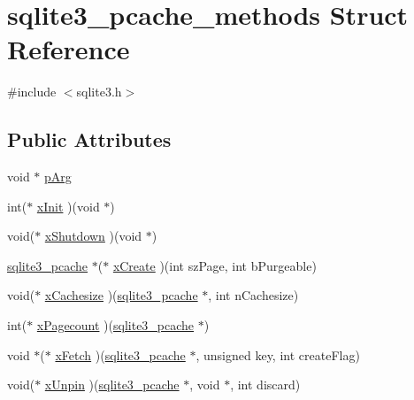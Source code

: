 \hypertarget{structsqlite3__pcache__methods}{}\section{sqlite3\+\_\+pcache\+\_\+methods Struct Reference}
\label{structsqlite3__pcache__methods}


{\ttfamily \#include $<$sqlite3.\+h$>$}

\subsection*{Public Attributes}
\begin{DoxyCompactItemize}
\item 
void $\ast$ \mbox{\hyperlink{structsqlite3__pcache__methods_ac71a23fce5a94ac9bc6babdbbaf1b5b4}{p\+Arg}}
\item 
int($\ast$ \mbox{\hyperlink{structsqlite3__pcache__methods_ac75d3dbf840e6f05ea08d35ad0457fb2}{x\+Init}} )(void $\ast$)
\item 
void($\ast$ \mbox{\hyperlink{structsqlite3__pcache__methods_aa2835c25fac454b7ee7cfd9e625700d7}{x\+Shutdown}} )(void $\ast$)
\item 
\mbox{\hyperlink{sqlite3_8h_a096c453d937d51f7926d7d31c8e0bd2f}{sqlite3\+\_\+pcache}} $\ast$($\ast$ \mbox{\hyperlink{structsqlite3__pcache__methods_ac903d0438a7a1554c818b4c17585e790}{x\+Create}} )(int sz\+Page, int b\+Purgeable)
\item 
void($\ast$ \mbox{\hyperlink{structsqlite3__pcache__methods_ac9ccbed1bea2a902906bfeaa6a330b40}{x\+Cachesize}} )(\mbox{\hyperlink{sqlite3_8h_a096c453d937d51f7926d7d31c8e0bd2f}{sqlite3\+\_\+pcache}} $\ast$, int n\+Cachesize)
\item 
int($\ast$ \mbox{\hyperlink{structsqlite3__pcache__methods_a1e0895008a701c1843336f0e0dcd3f46}{x\+Pagecount}} )(\mbox{\hyperlink{sqlite3_8h_a096c453d937d51f7926d7d31c8e0bd2f}{sqlite3\+\_\+pcache}} $\ast$)
\item 
void $\ast$($\ast$ \mbox{\hyperlink{structsqlite3__pcache__methods_ae09b8ed29c2dd77157f26a69255fd482}{x\+Fetch}} )(\mbox{\hyperlink{sqlite3_8h_a096c453d937d51f7926d7d31c8e0bd2f}{sqlite3\+\_\+pcache}} $\ast$, unsigned key, int create\+Flag)
\item 
void($\ast$ \mbox{\hyperlink{structsqlite3__pcache__methods_a2aa1aefc301a0fe4998ed8397b028630}{x\+Unpin}} )(\mbox{\hyperlink{sqlite3_8h_a096c453d937d51f7926d7d31c8e0bd2f}{sqlite3\+\_\+pcache}} $\ast$, void $\ast$, int discard)
\item 

\end{DoxyCompactItemize}

